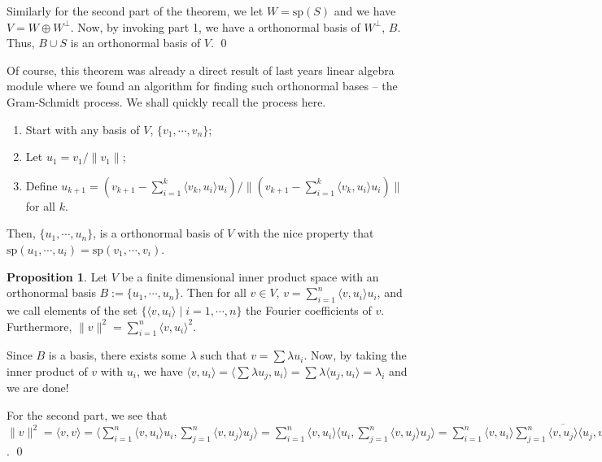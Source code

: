 \documentclass[
]{article}
\theoremstyle{definition}
\newtheorem{prop}{Proposition}[section]
\theoremstyle{definition}
\begin{document}
Similarly for the second part of the theorem, we let
\(W = \text{sp}(S)\) and we have \(V = W \oplus W^\bot\). Now, by
invoking part 1, we have a orthonormal basis of \(W^\bot\), \(B\). Thus,
\(B \cup S\) is an orthonormal basis of \(V\). \qed

Of course, this theorem was already a direct result of last years linear
algebra module where we found an algorithm for finding such orthonormal
bases -- the Gram-Schmidt process. We shall quickly recall the process
here.

\begin{enumerate}
  \item Start with any basis of \(V\), \(\{v_1, \cdots, v_n\}\);
  \item Let \(u_1 = v_1 / \|v_1\|\);
  \item Define \(u_{k + 1} = (v_{k + 1} - \sum_{i = 1}^k \langle v_k, u_i \rangle u_i) / 
    \| (v_{k + 1} - \sum_{i = 1}^k \langle v_k, u_i \rangle u_i) \|\) for all \(k\).
\end{enumerate}

Then, \(\{u_1, \cdots, u_n\}\), is a orthonormal basis of \(V\) with the
nice property that
\(\text{sp}(u_1, \cdots, u_i) = \text{sp}(v_1, \cdots, v_i)\).

\begin{prop}
  Let \(V\) be a finite dimensional inner product space with an orthonormal 
  basis \(B := \{u_1, \cdots, u_n\}\). Then for all \(v \in V\), 
  \(v = \sum_{i = 1}^n \langle v, u_i \rangle u_i\), and we call elements of the set 
  \(\{\langle v, u_i \rangle \mid i = 1, \cdots, n\}\) the Fourier coefficients 
  of \(v\). Furthermore, \(\| v \|^2 = \sum_{i = 1}^n \langle v, u_i \rangle^2\).
\end{prop}
\proof

Since \(B\) is a basis, there exists some \(\lambda\) such that
\(v = \sum \lambda u_i\). Now, by taking the inner product of \(v\) with
\(u_i\), we have
\(\langle v, u_i \rangle = \langle \sum \lambda u_j, u_i \rangle  = \sum \lambda \langle u_j, u_i \rangle = \lambda_i\)
and we are done!

For the second part, we see that
\(\| v \|^2 = \langle v, v \rangle  = \langle \sum_{i = 1}^n \langle v, u_i \rangle u_i,  \sum_{j = 1}^n \langle v, u_j \rangle u_j \rangle  = \sum_{i = 1}^n \langle v, u_i \rangle \langle u_i,  \sum_{j = 1}^n \langle v, u_j \rangle u_j \rangle  = \sum_{i = 1}^n \langle v, u_i \rangle \overline{  \sum_{j = 1}^n \langle v, u_j \rangle \langle u_j, u_i \rangle}  = \sum_{i = 1}^n \langle v, u_i \rangle \overline{\langle v, u_i \rangle}  = \sum_{i = 1}^n \langle v, u_i \rangle^2\).
\qed
\end{document}
